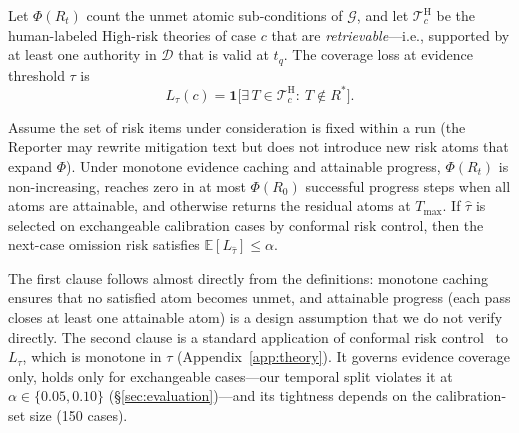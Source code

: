 Let $\Phi(R_t)$ count the unmet atomic sub-conditions of $\mathcal{G}$, and let $\mathcal{T}^{\text{H}}_c$ be the human-labeled High-risk theories of case $c$ that are \emph{retrievable}---i.e., supported by at least one authority in $\mathcal{D}$ that is valid at $t_q$. The coverage loss at evidence threshold $\tau$ is
\begin{equation}
  L_\tau(c)=\mathbf{1}\bigl[\exists\,T\in\mathcal{T}^{\text{H}}_c:\ T\notin R^*\bigr].
\end{equation}
\begin{proposition}
\label{prop:termination}
Assume the set of risk items under consideration is fixed within a run (the Reporter may rewrite mitigation text but does not introduce new risk atoms that expand $\Phi$). Under monotone evidence caching and attainable progress, $\Phi(R_t)$ is non-increasing, reaches zero in at most $\Phi(R_0)$ successful progress steps when all atoms are attainable, and otherwise returns the residual atoms at $T_{\max}$. If $\hat\tau$ is selected on exchangeable calibration cases by conformal risk control, then the next-case omission risk satisfies $\mathbb{E}[L_{\hat\tau}]\le\alpha$.
\end{proposition}
The first clause follows almost directly from the definitions: monotone caching ensures that no satisfied atom becomes unmet, and attainable progress (each pass closes at least one attainable atom) is a design assumption that we do not verify directly. The second clause is a standard application of conformal risk control~\citep{angelopoulos2023conformalrisk} to $L_\tau$, which is monotone in $\tau$ (Appendix~\ref{app:theory}). It governs evidence coverage only, holds only for exchangeable cases---our temporal split violates it at $\alpha\in\{0.05,0.10\}$ (\S\ref{sec:evaluation})---and its tightness depends on the calibration-set size (150 cases).

